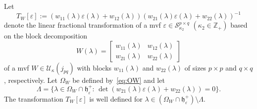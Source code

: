 \documentclass[12pt,twoside,a4paper]{amsart}
\theoremstyle{definition}
\numberwithin{equation}{section}
\begin{document}
Let
\begin{equation}\label{eq:2.2}
  T_W[\varepsilon]:=(w_{11}({\lambda})\varepsilon({\lambda})+w_{12}({\lambda}))
  (w_{21}({\lambda})\varepsilon({\lambda})+w_{22}({\lambda}))^{-1}
\end{equation}
denote the linear fractional transformation of a mvf $\varepsilon\in
{\mathcal S}^{p\times q}_{\kappa_2}$ $(\kappa_2\in {\mathbb{Z}}_+)$ based on the
block decomposition
\begin{equation}\label{eq:2.1}
W({\lambda})=\left[\begin{array}{ll}
 w_{11}({\lambda}) & w_{12}({\lambda}) \\
  w_{21}({\lambda}) & w_{22}({\lambda})
\end{array}\right]
\end{equation}
of a mvf $W\in{{\mathcal U}}_\kappa(j_{pq})$ with blocks $w_{11}({\lambda})$ and
$w_{22}({\lambda})$ of sizes $p\times p$ and $q\times q$, respectively.
Let  $\Omega_W$ be defined by~\eqref{eq:OW} and let
\begin{equation}\label{eq:Lambda}
    \Lambda=\{\lambda\in \Omega_W\cap {{\mathfrak h}}_\varepsilon^+:\,
{\det}\left(w_{21}(\lambda)\varepsilon(\lambda)+w_{22}(\lambda)\right)=0\}.
\end{equation}
 The transformation $T_W[\varepsilon]$ is well defined for
${\lambda}\in(\Omega_W\cap {{\mathfrak h}}_\varepsilon^+)\setminus\Lambda.$
\end{document}
